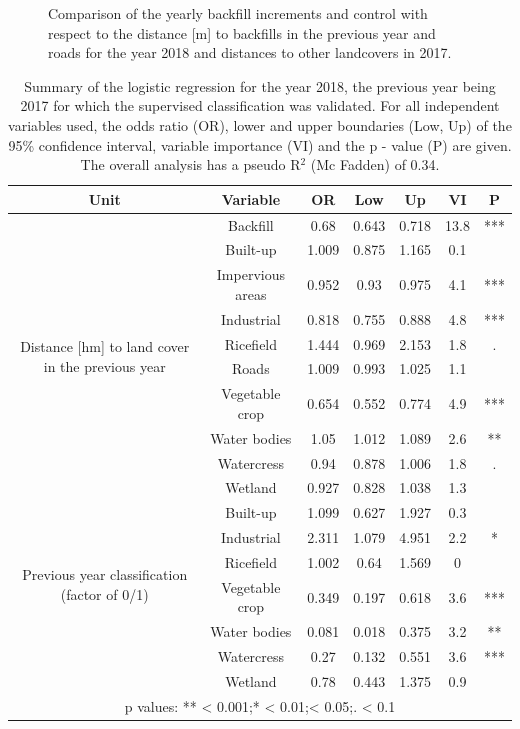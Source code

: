 \documentclass[11pt, A4, oneside]{report}
\begin{document}
\begin{figure}[H]
\caption{Comparison of the yearly backfill increments and control with respect to the distance [m] to backfills in the previous year and roads for the year 2018 and distances to other landcovers in 2017.}
\label{fig:logibox_17}
\end{figure}

\begin{table}[ht]
\centering
\caption{Summary of the logistic regression for the year 2018, the previous year being 2017 for which the supervised classification was validated. For all independent variables used, the odds ratio (OR), lower and upper boundaries (Low, Up) of the 95\% confidence interval, variable importance (VI) and the p - value (P) are given. The overall analysis has a pseudo R$^2$ (Mc Fadden) of 0.34.} 
\label{tab:logreg18}
\begin{tabular}{ccccccc}

    \hline
  Unit & Variable & OR & Low & Up & VI & P \\ 
  \hline
\multirow{10}{3cm}{Distance [hm] to land cover in the previous year} 
 & Backfill & 0.68 & 0.643 & 0.718 & 13.8 & *** \\ 
  & Built-up & 1.009 & 0.875 & 1.165 & 0.1 &  \\ 
  & Impervious areas & 0.952 & 0.93 & 0.975 & 4.1 & *** \\ 
  & Industrial & 0.818 & 0.755 & 0.888 & 4.8 & *** \\ 
  & Ricefield & 1.444 & 0.969 & 2.153 & 1.8 & . \\ 
  & Roads & 1.009 & 0.993 & 1.025 & 1.1 &  \\ 
  & Vegetable crop & 0.654 & 0.552 & 0.774 & 4.9 & *** \\ 
  & Water bodies & 1.05 & 1.012 & 1.089 & 2.6 & ** \\ 
  & Watercress & 0.94 & 0.878 & 1.006 & 1.8 & . \\ 
  & Wetland & 0.927 & 0.828 & 1.038 & 1.3 &  \\ 
   \hline
\multirow{6}{3cm}{Previous year classification (factor of 0/1)}
  & Built-up & 1.099 & 0.627 & 1.927 & 0.3 &  \\ 
  & Industrial & 2.311 & 1.079 & 4.951 & 2.2 & * \\ 
  & Ricefield & 1.002 & 0.64 & 1.569 & 0 &  \\ 
  & Vegetable crop & 0.349 & 0.197 & 0.618 & 3.6 & *** \\ 
  & Water bodies & 0.081 & 0.018 & 0.375 & 3.2 & ** \\ 
  & Watercress & 0.27 & 0.132 & 0.551 & 3.6 & *** \\ 
  & Wetland & 0.78 & 0.443 & 1.375 & 0.9 &  \\ 
    \hline
   \multicolumn{7}{c}{p values: \qquad *** < 0.001;\quad ** < 0.01;\quad * < 0.05;\quad . < 0.1 }\\
   \hline
\end{tabular}

\end{table}
\end{document}
